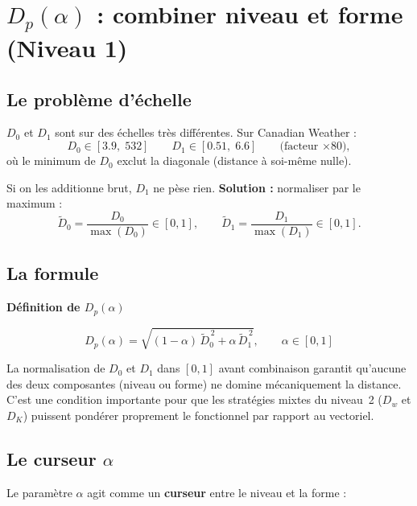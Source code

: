 \documentclass[11pt, a4paper]{article}
\newcommand{\Dp}{D_p}
\newcommand{\Dw}{D_w}
\newcommand{\DK}{D_K}
\newenvironment{keybox}[1][]{%
  \def\FrameCommand{\fboxsep=8pt \fcolorbox{emphborder}{emphbox}}%
  \MakeFramed{\advance\hsize-\width \FrameRestore}%
  \noindent\textbf{#1}\par\smallskip\noindent\ignorespaces
}{\endMakeFramed}
\begin{document}
\newpage
\section{$\Dp(\alpha)$ : combiner niveau et forme (Niveau 1)}

\subsection{Le problème d'échelle}

$D_0$ et $D_1$ sont sur des échelles très différentes. Sur Canadian Weather :
\[
  D_0 \in [3.9,\; 532] \qquad D_1 \in [0.51,\; 6.6] \qquad \text{(facteur $\times 80$)},
\]
où le minimum de $D_0$ exclut la diagonale (distance à soi-même nulle).

Si on les additionne brut, $D_1$ ne pèse rien. \textbf{Solution :}
normaliser par le maximum :
\[
  \tilde{D}_0 = \frac{D_0}{\max(D_0)} \in [0,1], \qquad
  \tilde{D}_1 = \frac{D_1}{\max(D_1)} \in [0,1].
\]

\subsection{La formule}

\begin{keybox}[Définition de $\Dp(\alpha)$]
\[
  \Dp(\alpha) = \sqrt{(1 - \alpha)\,\tilde{D}_0^{\,2}
  + \alpha\,\tilde{D}_1^{\,2}},
  \qquad \alpha \in [0, 1]
\]
\end{keybox}

La normalisation de $D_0$ et $D_1$ dans $[0,1]$ avant combinaison
garantit qu'aucune des deux composantes (niveau ou forme) ne domine
mécaniquement la distance. C'est une condition importante pour que les
stratégies mixtes du niveau~2 ($\Dw$ et $\DK$) puissent pondérer
proprement le fonctionnel par rapport au vectoriel.

\subsection{Le curseur $\alpha$}

Le paramètre $\alpha$ agit comme un \textbf{curseur} entre le niveau
et la forme :

\begin{figure}[H]
\centering
{}
\end{figure}
\end{document}
